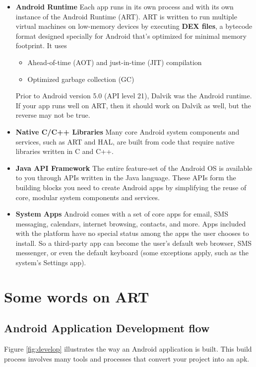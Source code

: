 \begin{itemize}
	\item \textbf{Android Runtime} Each app runs in its own process and with its own instance of the Android Runtime (ART).
		ART is written to run multiple virtual machines on low-memory devices by executing \textbf{DEX files}, a bytecode format designed specially for Android that's optimized for minimal memory footprint.
		It uses
		\begin{itemize}
			\item Ahead-of-time (AOT) and just-in-time (JIT) compilation \cite{}
			\item Optimized garbage collection (GC)
		\end{itemize}
		Prior to Android version 5.0 (API level 21), Dalvik was the Android runtime.
		If your app runs well on ART, then it should work on Dalvik as well, but the reverse may not be true.
		
	\item \textbf{Native C/C++ Libraries} Many core Android system components and services, such as ART and HAL, are built from code that require native libraries written in C and C++.
	
	\item \textbf{Java API Framework} The entire feature-set of the Android OS is available to you through APIs written in the Java language.
		These APIs form the building blocks you need to create Android apps by simplifying the reuse of core, modular system components and services.
		
	\item \textbf{System Apps} Android comes with a set of core apps for email, SMS messaging, calendars, internet browsing, contacts, and more.
		Apps included with the platform have no special status among the apps the user chooses to install.
		So a third-party app can become the user's default web browser, SMS messenger, or even the default keyboard (some exceptions apply, such as the system's Settings app).
\end{itemize}

\section{Some words on ART}
\subsection{Android Application Development flow}
Figure \ref{fig:develop} illustrates the way an Android application is built.
This build process involves many tools and processes that convert your project into an \gls{apk}.

